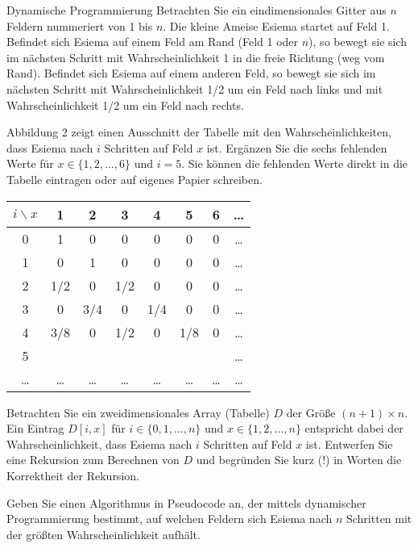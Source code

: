 \documentclass{exercisesheet}
\begin{document}
\begin{eexercises}{Dynamische Programmierung}{
    Betrachten Sie ein eindimensionales Gitter aus $n$ Feldern nummeriert von 1 bis $n$. Die kleine Ameise Esiema startet auf Feld 1. Befindet sich Esiema auf einem Feld am Rand (Feld 1 oder $n$), so bewegt sie sich im nächsten Schritt mit Wahrscheinlichkeit 1 in die freie Richtung (weg vom Rand). Befindet sich Esiema auf einem anderen Feld, so bewegt sie sich im nächsten Schritt mit Wahrscheinlichkeit 1/2 um ein Feld nach links und mit Wahrscheinlichkeit 1/2 um ein Feld nach rechts.
  }
  \item Abbildung 2 zeigt einen Ausschnitt der Tabelle mit den Wahrscheinlichkeiten, dass Esiema nach $i$ Schritten auf Feld $x$ ist. Ergänzen Sie die sechs fehlenden Werte für $x \in \{1,2,\ldots,6\}$ und $i = 5$. Sie können die fehlenden Werte direkt in die Tabelle eintragen oder auf eigenes Papier schreiben.
  \begin{tabular}{c|cccc ccc}
    $i \backslash x$ & 1      & 2      & 3      & 4      & 5      & 6      & \ldots \\
    \hline
    0                & 1      & 0      & 0      & 0      & 0      & 0      & \ldots \\
    1                & 0      & 1      & 0      & 0      & 0      & 0      & \ldots \\
    2                & 1/2    & 0      & 1/2    & 0      & 0      & 0      & \ldots \\
    3                & 0      & 3/4    & 0      & 1/4    & 0      & 0      & \ldots \\
    4                & 3/8    & 0      & 1/2    & 0      & 1/8    & 0      & \ldots \\
    5                &        &        &        &        &        &        & \ldots \\
    \ldots           & \ldots & \ldots & \ldots & \ldots & \ldots & \ldots & \ldots \\
  \end{tabular}
  \item Betrachten Sie ein zweidimensionales Array (Tabelle) $D$ der Größe $(n + 1) \times n$. Ein Eintrag $D[i,x]$ für $i \in \{0,1,\ldots,n\}$ und $x \in \{1,2,\ldots,n\}$ entspricht dabei der Wahrscheinlichkeit, dass Esiema nach $i$ Schritten auf Feld $x$ ist. Entwerfen Sie eine Rekursion zum Berechnen von $D$ und begründen Sie kurz (!) in Worten die Korrektheit der Rekursion.
  \item Geben Sie einen Algorithmus in Pseudocode an, der mittels dynamischer Programmierung bestimmt, auf welchen Feldern sich Esiema nach $n$ Schritten mit der größten Wahrscheinlichkeit aufhält.
\end{eexercises}
\end{document}
